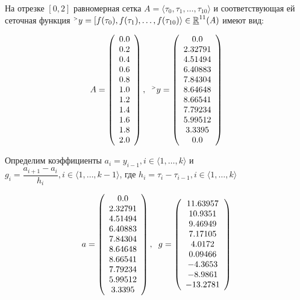 \documentclass[12pt]{article}
\begin{document}
На отрезке  $[0,2]$ равномерная сетка $A = \langle \tau_0, \tau_1, \dots, \tau_{10} \rangle $ и соответствующая ей сеточная функция ${}^{\mathsmaller{>}} y = [f(\tau_0), f(\tau_1), \dots, f(\tau_{10}) \rangle \in \underline{\mathbb R}^{11}(A) $ имеют вид:

$$ 
A =
\left(
\begin{array}{c}
	0.0 \\ 0.2 \\ 0.4 \\ 0.6 \\ 0.8 \\ 1.0 \\ 1.2 \\ 1.4 \\ 1.6 \\ 1.8 \\ 2.0
\end{array}
\right) ,
\hspace{0.2cm}
{}^{\mathsmaller{>}} y = 
\left(
\begin{array}{c}
0.0 \\ 2.32791 \\ 4.51494 \\ 6.40883 \\ 7.84304 \\ 8.64648 \\ 8.66541 \\ 7.79234 \\ 5.99512 \\ 3.3395 \\ 0.0
\end{array}
\right)
$$ 

Определим коэффициенты $a_i = y_{i-1}, 	i \in \langle 1, \ldots, k \rangle$ и $g_i = \dfrac{a_{i+1} - a_i}{h_i} , 	i \in \langle 1, \ldots, k - 1 \rangle$, где $h_i = \tau_i - \tau_{i-1}, i \in \langle 1, \ldots, k \rangle$

$$ 
a =
\left(
\begin{array}{c}
0.0 \\ 2.32791 \\ 4.51494 \\ 6.40883 \\ 7.84304 \\ 8.64648 \\ 8.66541 \\ 7.79234 \\ 5.99512 \\ 3.3395
\end{array}
\right) ,
\hspace{0.2cm}
g = 
\left(
\begin{array}{c}
	11.63957 \\ 10.9351 \\ 9.46949 \\ 7.17105 \\ 4.0172 \\ 0.09466 \\ -4.3653 \\ -8.9861 \\ -13.2781
\end{array}
\right)
$$ 
\end{document}
